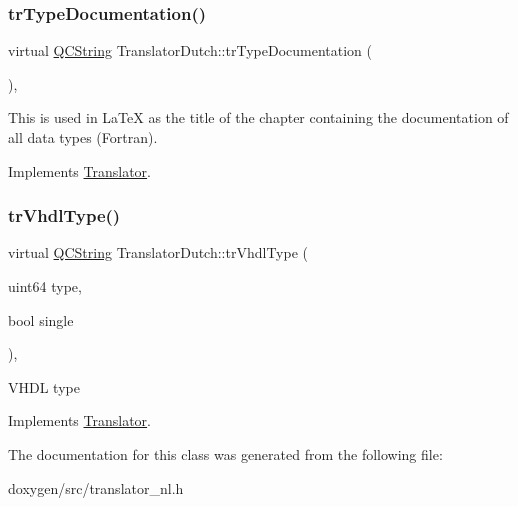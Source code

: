 \subsubsection{\texorpdfstring{trTypeDocumentation()}{trTypeDocumentation()}}
{\footnotesize\ttfamily virtual \mbox{\hyperlink{class_q_c_string}{Q\+C\+String}} Translator\+Dutch\+::tr\+Type\+Documentation (\begin{DoxyParamCaption}{ }\end{DoxyParamCaption})\hspace{0.3cm}{\ttfamily [inline]}, {\ttfamily [virtual]}}

This is used in La\+TeX as the title of the chapter containing the documentation of all data types (Fortran). 

Implements \mbox{\hyperlink{class_translator}{Translator}}.

\mbox{\label{class_translator_dutch_a9fc04b8d764381f52d9c54bf17cffb3b}} 
\subsubsection{\texorpdfstring{trVhdlType()}{trVhdlType()}}
{\footnotesize\ttfamily virtual \mbox{\hyperlink{class_q_c_string}{Q\+C\+String}} Translator\+Dutch\+::tr\+Vhdl\+Type (\begin{DoxyParamCaption}\item[{uint64}]{type,  }\item[{bool}]{single }\end{DoxyParamCaption})\hspace{0.3cm}{\ttfamily [inline]}, {\ttfamily [virtual]}}

V\+H\+DL type 

Implements \mbox{\hyperlink{class_translator}{Translator}}.



The documentation for this class was generated from the following file\+:\begin{DoxyCompactItemize}
\item 
doxygen/src/translator\+\_\+nl.\+h\end{DoxyCompactItemize}
